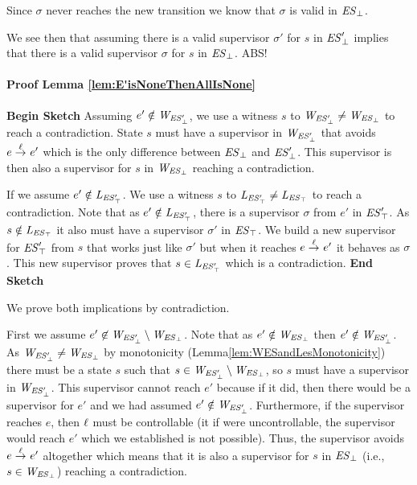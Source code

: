 \begin{itemize}
	Since $\sigma$ never reaches the new transition we know that $\sigma$ is valid in $\mathit{\mathit{ES}_{\bot}}$.
		
	We see then that assuming there is a valid supervisor $\sigma'$ for $s$ in $\mathit{\mathit{ES}'_{\bot}}$ implies that there is a valid supervisor $\sigma$ for $s$ in $\mathit{\mathit{ES}_{\bot}}$. ABS! \\
	
\end{itemize}


\paragraph*{Proof Lemma \ref{lem:E'isNoneThenAllIsNone}}
\textbf{Begin Sketch}
Assuming $e' \notin \mathit{W_{\mathit{\mathit{ES}'_{\bot}}}}$, we use a witness $s$ to $\mathit{W_{\mathit{\mathit{ES}'_{\bot}}}} \neq 
\mathit{W_{\mathit{\mathit{ES}_{\bot}}}}$ to reach a contradiction. State $s$ must have a supervisor in 
$\mathit{W_{\mathit{\mathit{ES}'_{\bot}}}}$  that avoids $e \overset{\ell}{\rightarrow}_{} e'$ which is the only difference 
between $\mathit{\mathit{ES}_{\bot}}$ and 
$\mathit{\mathit{ES}'_{\bot}}$. This supervisor is then also a 
supervisor for $s$ in $\mathit{W_{\mathit{\mathit{ES}_{\bot}}}}$ reaching a contradiction. 

If we assume $e' \notin \mathit{L_{\mathit{\mathit{ES}'_{\top}}}}$.  We use a witness $s$ to $\mathit{L_{\mathit{\mathit{ES}'_{\top}}}} 
\neq 
\mathit{L_{\mathit{\mathit{ES}_{\top}}}}$ to reach a contradiction. Note that as $e' \notin \mathit{L_{\mathit{\mathit{ES}'_{\top}}}}$, there 
is a supervisor $\sigma$ from $e'$ in  
$\mathit{\mathit{ES}'_{\top}}$.  As $s \notin \mathit{L_{\mathit{\mathit{ES}_{\top}}}}$ it also must 
have a 
supervisor $\sigma'$ in  $\mathit{\mathit{ES}_{\top}}$. We build 
a 
new supervisor for $\mathit{\mathit{ES}'_{\top}}$ from $s$ that 
works just like $\sigma'$ but when it reaches $e \overset{\ell}{\rightarrow}_{} e'$ it 
behaves as $\sigma$. This new supervisor proves that $s \in \mathit{L_{\mathit{\mathit{ES}'_{\top}}}}$ 
which is a contradiction. 
\textbf{End Sketch}

We prove both implications by contradiction. 

First we assume $e' \not\in 
\mathit{W_{\mathit{\mathit{ES}'_{\bot}}}} \setminus \mathit{W_{\mathit{\mathit{ES}_{\bot}}}}$. Note that as $e' \notin \mathit{W_{\mathit{\mathit{ES}_{\bot}}}}$ then $e' 
\notin 
\mathit{W_{\mathit{\mathit{ES}'_{\bot}}}}$.  As $\mathit{W_{\mathit{\mathit{ES}'_{\bot}}}} \neq \mathit{W_{\mathit{\mathit{ES}_{\bot}}}}$ by monotonicity 
(Lemma\ref{lem:WESandLesMonotonicity}) there must be a state $s$ 
such that $s \in \mathit{W_{\mathit{\mathit{ES}'_{\bot}}}} \setminus 
\mathit{W_{\mathit{\mathit{ES}_{\bot}}}}$, so $s$ must have a supervisor in $\mathit{W_{\mathit{\mathit{ES}'_{\bot}}}} $. This supervisor 
cannot reach $e'$ because if it did, 
then there would be a supervisor for $e'$ and we had assumed $e' 
\notin \mathit{W_{\mathit{\mathit{ES}'_{\bot}}}}$. Furthermore, if the supervisor reaches $e$, then 
$\ell$ 
must be controllable (it if were uncontrollable, the supervisor would 
reach $e'$ which we established is not possible). Thus, the 
supervisor 
avoids $e \overset{\ell}{\rightarrow}_{} e'$ altogether which means that it is also a 
supervisor for $s$ in $\mathit{\mathit{ES}_{\bot}}$ (i.e.,  $s 
\in 
\mathit{W_{\mathit{\mathit{ES}_{\bot}}}}$) reaching a contradiction.



